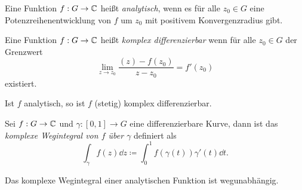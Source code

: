 \begin{definition}
    Eine Funktion $f : G \to \mathbb{C}$ heißt \emph{analytisch}, wenn es für alle $z_0 \in G$ eine Potenzreihenentwicklung von $f$ um $z_0$ mit positivem Konvergenzradius gibt.

    Eine Funktion $f : G \to \mathbb{C}$ heißt \emph{komplex differenzierbar} wenn für alle $z_0 \in G$ der Grenzwert
    $$ \lim_{z \to z_0} \frac{(z) - f(z_0)}{z - z_0} = f'(z_0) $$
    existiert.
\end{definition}

\begin{remark}
    Ist $f$ analytisch, so ist $f$ (stetig) komplex differenzierbar.
\end{remark}

\begin{definition}
    Sei $f : G \to \mathbb{C}$ und $\gamma : [0,1] \to G$ eine differenzierbare Kurve, dann ist das \emph{komplexe Wegintegral von $f$ über $\gamma$} definiert als
    $$ \int_\gamma f(z) \dd z \coloneqq \int_0^1 f(\gamma(t)) \gamma'(t) \dd t. $$
\end{definition}

\begin{remark}
    Das komplexe Wegintegral einer analytischen Funktion ist wegunabhängig.
\end{remark}